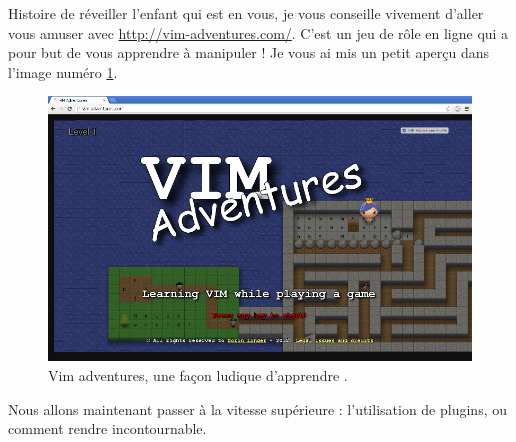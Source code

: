 \bigskip
Histoire de réveiller l'enfant qui est en vous, je vous conseille vivement d'aller vous amuser avec \url{http://vim-adventures.com/}. C'est un jeu de rôle en ligne qui a pour but de vous apprendre à manipuler \vim ! Je vous ai mis un petit aperçu dans l'image numéro \ref{fig:vim-adventures}.

\begin{figure}%
  \includegraphics[width=\linewidth]{graphics/vim-adventures.png}
  \caption{Vim adventures, une façon ludique d'apprendre \vim.}
  \label{fig:vim-adventures}
\end{figure}


Nous allons maintenant passer à la vitesse supérieure : l'utilisation de plugins, ou comment rendre \vim incontournable.
